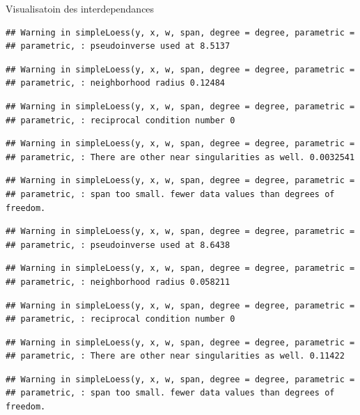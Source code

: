 \documentclass[11pt,ignorenonframetext,]{beamer}
\begin{document}
\begin{frame}[fragile]{Visualisatoin des interdependances}
\begin{verbatim}
## Warning in simpleLoess(y, x, w, span, degree = degree, parametric =
## parametric, : pseudoinverse used at 8.5137
\end{verbatim}

\begin{verbatim}
## Warning in simpleLoess(y, x, w, span, degree = degree, parametric =
## parametric, : neighborhood radius 0.12484
\end{verbatim}

\begin{verbatim}
## Warning in simpleLoess(y, x, w, span, degree = degree, parametric =
## parametric, : reciprocal condition number 0
\end{verbatim}

\begin{verbatim}
## Warning in simpleLoess(y, x, w, span, degree = degree, parametric =
## parametric, : There are other near singularities as well. 0.0032541
\end{verbatim}

\begin{verbatim}
## Warning in simpleLoess(y, x, w, span, degree = degree, parametric =
## parametric, : span too small. fewer data values than degrees of freedom.
\end{verbatim}

\begin{verbatim}
## Warning in simpleLoess(y, x, w, span, degree = degree, parametric =
## parametric, : pseudoinverse used at 8.6438
\end{verbatim}

\begin{verbatim}
## Warning in simpleLoess(y, x, w, span, degree = degree, parametric =
## parametric, : neighborhood radius 0.058211
\end{verbatim}

\begin{verbatim}
## Warning in simpleLoess(y, x, w, span, degree = degree, parametric =
## parametric, : reciprocal condition number 0
\end{verbatim}

\begin{verbatim}
## Warning in simpleLoess(y, x, w, span, degree = degree, parametric =
## parametric, : There are other near singularities as well. 0.11422
\end{verbatim}

\begin{verbatim}
## Warning in simpleLoess(y, x, w, span, degree = degree, parametric =
## parametric, : span too small. fewer data values than degrees of freedom.
\end{verbatim}


\end{frame}
\end{document}
